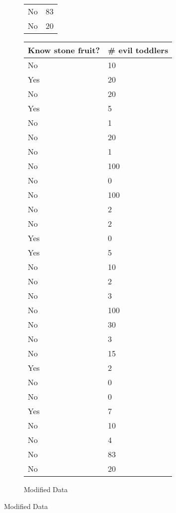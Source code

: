 \documentclass{article}
\begin{document}
\begin{figure}
\begin{subfigure}{.5\textwidth}
\begin{tabular}{p{3cm}|p{3cm}}
            No & 83 \\
            No & 20 \\
        \end{tabular}
    \end{subfigure}%
    \begin{subfigure}{.5\textwidth}
        \centering
        \caption{Modified Data}
        \label{subfig:modified}
        \begin{tabular}{p{3cm}|p{3cm}}
            \toprule
            Know stone fruit? & \# evil toddlers \\
            \midrule
            No & 10 \\
            Yes & 20 \\
            No & 20 \\
            Yes & 5 \\
            No & 1 \\
            No & 20 \\
            No & 1 \\
            No & 100 \\
            No & 0 \\
            No & 100 \\
            No & 2 \\
            No & 2 \\
            Yes & 0 \\
            Yes & 5 \\
            No & 10 \\
            No & 2 \\
            No & 3 \\
            No & 100 \\
            No & 30 \\
            No & 3 \\
            No & 15 \\
            Yes & 2 \\
            No & 0 \\
            No & 0 \\
            Yes & 7 \\
            No & 10 \\
            No & 4 \\
            No & 83 \\
            No & 20 \\
        \end{tabular}
    \end{subfigure}%
\end{figure}
\end{document}
